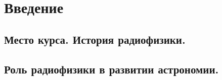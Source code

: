 \documentclass[../main/main.tex]{subfiles}
\begin{document}
\section*{Введение}

\subsection*{Место курса. История радиофизики.}


\subsection*{Роль радиофизики в развитии астрономии.}
\end{document}
